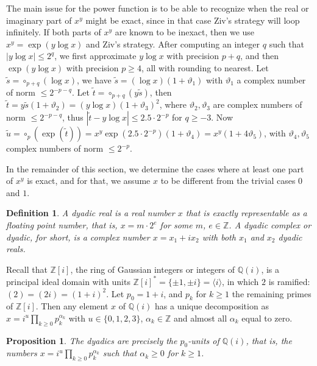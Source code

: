 \documentclass [11pt]{article}
\newcommand {\round}{\operatorname {\circ}}
\newcommand {\Z}{\mathbb Z}
\newcommand {\Q}{\mathbb Q}
\renewcommand {\theta}{\vartheta}
\renewcommand {\leq}{\leqslant}
\renewcommand {\geq}{\geqslant}
\newtheorem{definition}[theorem]{Definition}
\newtheorem{prop}[theorem]{Proposition}
\begin{document}
The main issue for the power function is to be able to recognize when the
real or imaginary part of $x^y$ might be exact, since in that case
Ziv's strategy will loop infinitely.
If both parts of $x^y$ are known to be inexact, then we use
$x^y = \exp(y \log x)$ and Ziv's strategy.
After computing an integer $q$ such that $|y \log x| \leq 2^q$, we first
approximate $y \log x$ with precision $p + q$, and then
$\exp(y \log x)$ with precision $p \geq 4$, all with rounding
to nearest.
Let $\tilde{s} = \round_{p+q}(\log x)$,
we have $\tilde{s} = (\log x) (1 + \theta_1)$
with $\theta_1$ a complex number of norm $\leq 2^{-p-q}$.
Let $\tilde{t} = \round_{p+q}(y \tilde{s})$, then
$\tilde{t} = y \tilde{s} (1 + \theta_2) = (y \log x) (1 + \theta_3)^2$,
where $\theta_2, \theta_3$ are complex numbers of norm $\leq 2^{-p-q}$,
thus $|\tilde{t} - y \log x| \leq 2.5 \cdot 2^{-p}$ for $q \geq -3$.
Now $\tilde{u} = \round_p(\exp(\tilde{t})) =
x^y \exp(2.5 \cdot 2^{-p}) (1 + \theta_4) = x^y (1 + 4 \theta_5)$,
with $\theta_4, \theta_5$ complex numbers of norm $\leq 2^{-p}$.

In the remainder of this section, we determine the cases where at
least one part of $x^y$ is exact, and for that, we assume $x$ to be
different from the trivial cases $0$ and $1$.

\begin {definition}
A {\em dyadic real} is a real number $x$ that is exactly representable
as a floating point number, that is, $x = m \cdot 2^e$ for some $m$, $e \in \Z$.
A {\em dyadic complex} or {\em dyadic}, for short, is a complex number
$x = x_1 + i x_2$ with both $x_1$ and $x_2$ dyadic reals.
\end {definition}

Recall that $\Z [i]$, the ring of Gaussian integers or integers of $\Q (i)$,
is a principal ideal domain with units
$\Z [i]^\ast = \{ \pm 1, \pm i \} = \langle i \rangle$,
in which $2$ is ramified: $(2) = (2 i) = (1 + i)^2$. Let $p_0 = 1 + i$, and
$p_k$ for $k \geq 1$ the remaining primes of $\Z [i]$. Then any element
$x$ of $\Q (i)$ has a unique decomposition as
$x = i^u \prod_{k \geq 0} p_k^{\alpha_k}$ with $u \in \{ 0, 1, 2, 3\}$,
$\alpha_k \in \Z$ and almost all $\alpha_k$ equal to zero.

\begin {prop}
\label {prop:dyadic}
The dyadics are precisely the $p_0$-units of $\Q (i)$, that is,
the numbers $x = i^u \prod_{k \geq 0} p_k^{\alpha_k}$
such that $\alpha_k \geq 0$ for $k \geq 1$.
\end {prop}
\end{document}
